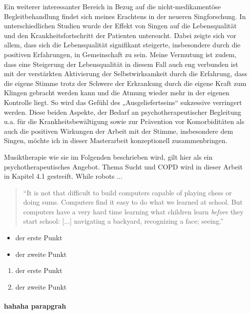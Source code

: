 Ein weiterer interessanter Bereich in Bezug auf die nicht-medikamentöse Begleitbehandlung findet sich meines Erachtens in der neueren Singforschung. In unterschiedlichen Studien wurde der Effekt von Singen auf die Lebensqualität und den Krankheitsfortschritt der Patienten untersucht. Dabei zeigte sich vor allem, dass sich die Lebensqualität signifikant steigerte, insbesondere durch die positiven Erfahrungen, in Gemeinschaft zu sein. Meine Vermutung ist zudem, dass eine Steigerung der Lebensqualität in diesem Fall auch eng verbunden ist mit der verstärkten Aktivierung der Selbstwirksamkeit durch die Erfahrung, dass die eigene Stimme trotz der Schwere der Erkrankung durch die eigene Kraft zum Klingen gebracht werden kann und die Atmung wieder mehr in der eigenen Kontrolle liegt. So wird das Gefühl des „Ausgeliefertseins“ sukzessive verringert werden.
Diese beiden Aspekte, der Bedarf an psychotherapeutischer Begleitung u.a. für die Krankheitsbewältigung sowie zur Prävention vor Komorbiditäten als auch die positiven Wirkungen der Arbeit mit der Stimme, insbesondere dem Singen, möchte ich in dieser Masterarbeit konzeptionell zusammenbringen.

Musiktherapie wie sie im Folgenden beschrieben wird, gilt hier als ein psychotherapeutisches Angebot.
Thema Sucht und COPD wird in dieser Arbeit in Kapitel 4.1 gestreift. 
While robots ...

\begin{quote}
``It is not that difficult to build computers capable of playing chess or doing sums. Computers find it easy to do what we learned at school. But computers have a very hard time learning what children learn \textit{before} they start school: [...] navigating a backyard, recognizing a face; seeing.'' 
\end{quote}

\begin{itemize}
\item der erste Punkt
\item der zweite Punkt
\end{itemize}

\begin{enumerate}
\item der erste Punkt
\item der zweite Punkt
\end{enumerate}

\paragraph{hahaha parapgrah}


\newpage\thispagestyle{empty}